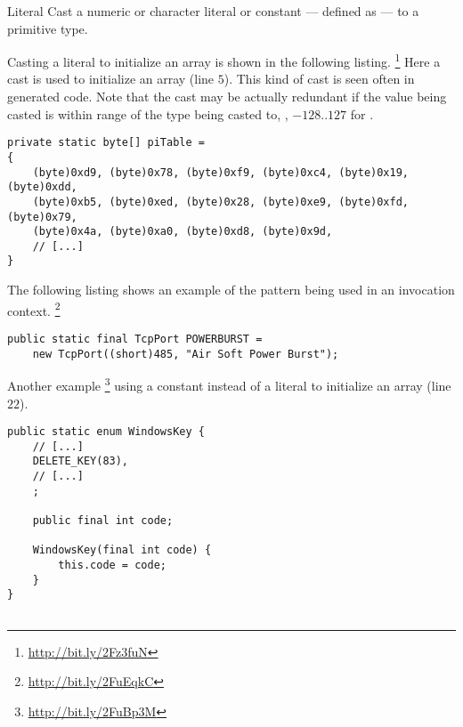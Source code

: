 \begin{pattern}{Literal}
%
%
Cast a numeric or character literal or constant --- defined as  ---
to a primitive type.

\instances{}
Casting a literal to initialize an array is shown in the following listing.%
\footnote{\url{http://bit.ly/2Fz3fuN}}
Here a cast is used to initialize an array (line $5$).
This kind of cast is seen often in generated code.
Note that the cast may be actually redundant if the value being casted
is within range of the type being casted to,
\eg{}, $-128..127$ for .

\begin{verbatim}
private static byte[] piTable =
{
    (byte)0xd9, (byte)0x78, (byte)0xf9, (byte)0xc4, (byte)0x19, (byte)0xdd,
    (byte)0xb5, (byte)0xed, (byte)0x28, (byte)0xe9, (byte)0xfd, (byte)0x79,
    (byte)0x4a, (byte)0xa0, (byte)0xd8, (byte)0x9d, 
    // [...]
}
\end{verbatim}

The following listing shows an example of the \thisp{} pattern
being used in an invocation context.%
\footnote{\url{http://bit.ly/2FuEqkC}}

\begin{verbatim}
public static final TcpPort POWERBURST =
    new TcpPort((short)485, "Air Soft Power Burst");
\end{verbatim}

Another example%
\footnote{\url{http://bit.ly/2FuBp3M}}
using a constant instead of a literal to initialize
an array (line $22$).

\begin{verbatim}
public static enum WindowsKey {
    // [...]
    DELETE_KEY(83), 
    // [...]
    ;

    public final int code;

    WindowsKey(final int code) {
        this.code = code;
    }
}


\end{verbatim}
\end{pattern}
